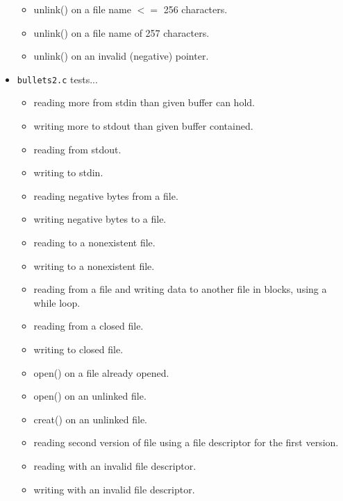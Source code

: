 \begin{itemize}
\begin{itemize}
\item unlink() on a file name $<=$ 256 characters.
\item unlink() on a file name of 257 characters.
\item unlink() on an invalid (negative) pointer.
\end{itemize}
\item \texttt{bullets2.c} tests... \begin{itemize}
\item reading more from stdin than given buffer can hold.
\item writing more to stdout than given buffer contained.
\item reading from stdout.
\item writing to stdin.
\item reading negative bytes from a file.
\item writing negative bytes to a file.
\item reading to a nonexistent file.
\item writing to a nonexistent file.
\item reading from a file and writing data to another file in blocks, using a while loop.
\item reading from a closed file.
\item writing to closed file.
\item open() on a file already opened.
\item open() on an unlinked file.
\item creat() on an unlinked file.
\item reading second version of file using a file descriptor for the first version.
\item reading with an invalid file descriptor.
\item writing with an invalid file descriptor.
\end{itemize}
\end{itemize}
